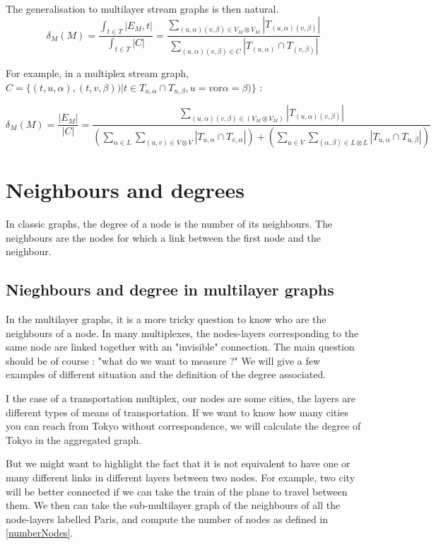 \documentclass[dvipsnames,a4paper,11pt]{article}
\theoremstyle{definition}
\theoremstyle{remark}
\theoremstyle{remark}
\begin{document}
	The generalisation to multilayer stream graphs is then natural.
	\[
		\delta_M (M) = \frac{\int_{t\in T}|E_M,t|}{\int_{t\in T}|C|} = \frac{\sum_{(u,\alpha)(v,\beta) \in V_M \otimes V_M}|T_{(u,\alpha)(v,\beta)}|}{\sum_{(u,\alpha)(v,\beta) \in C}|T_{(u,\alpha)}\cap T_{(v,\beta)}|}
	\]

	For example, in a multiplex stream graph, $C=\{(t,u,\alpha),(t,v,\beta))| t\in T_{u,\alpha} \cap T_{u,\beta}, u=v \text{or} \alpha = \beta)\}$ :

	\[
		\delta_M (M) = 
		\frac{|E_M|}{|C|}= 
		\frac{\sum_{(u,\alpha)(v,\beta) \in (V_M \otimes V_M)} |T_{(u,\alpha)(v,\beta)}|}
		{(\sum_{\alpha \in L}\sum_{(u,v) \in V\otimes V}|T_{u,\alpha} \cap T_{v,\alpha}|)+( \sum_{u \in V } \sum_{(\alpha,\beta) \in L \otimes L}|T_{u,\alpha}\cap T_{u,\beta}|)}
	\]

		\section{Neighbours and degrees}
	
		In classic graphs, the degree of a node is the number of its neighbours. The neighbours are the nodes for which a link between the first node and the neighbour.
		
		\subsection{Nieghbours and degree in multilayer graphs}
		
		In the multilayer graphs, it is a more tricky question to know who are the neighbours of a node. In many multiplexes, the nodes-layers corresponding to the same node are linked together with an "invisible" connection. The main question should be of course : "what do we want to measure ?" We will give a few examples of different situation and the definition of the degree associated.
		
		I the case of a transportation multiplex, our nodes are some cities, the layers are different types of means of transportation. If we want to know how many cities you can reach from Tokyo without correspondence, we will calculate the degree of Tokyo in the aggregated graph.
		
		But we might want to highlight the fact that it is not equivalent to have one or many different links in different layers between two nodes. For example, two city will be better connected if we can take the train of the plane to travel between them.  We then can take the sub-multilayer graph of the neighbours of all the node-layers labelled Paris, and compute the number of nodes as defined in \ref{numberNodes}. 
		
\end{document}

